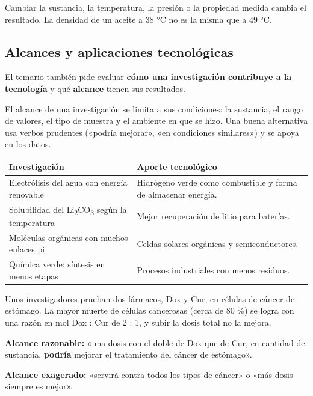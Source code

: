 \begin{ojo} Cambiar la sustancia, la temperatura, la presión o la propiedad medida cambia el resultado. La densidad de un aceite a 38 °C no es la misma que a 49 °C.\end{ojo}
\subsection{Alcances y aplicaciones tecnológicas}
El temario también pide evaluar \textbf{cómo una investigación contribuye a la tecnología} y qué \textbf{alcance} tienen sus resultados.

 

El alcance de una investigación se limita a sus condiciones: la sustancia, el rango de valores, el tipo de muestra y el ambiente en que se hizo. Una buena alternativa usa verbos prudentes («podría mejorar», «en condiciones similares») y se apoya en los datos.

 
\begin{center}\small
\begin{tabularx}{\linewidth}{@{}>{\raggedright\arraybackslash\hsize=1.00\hsize}X>{\raggedright\arraybackslash\hsize=1.00\hsize}X@{}}
\toprule
\textbf{Investigación} & \textbf{Aporte tecnológico} \\
\midrule
Electrólisis del agua con energía renovable & Hidrógeno verde como combustible y forma de almacenar energía. \\
Solubilidad del Li\textsubscript{2}CO\textsubscript{3} según la temperatura & Mejor recuperación de litio para baterías. \\
Moléculas orgánicas con muchos enlaces pi & Celdas solares orgánicas y semiconductores. \\
Química verde: síntesis en menos etapas & Procesos industriales con menos residuos. \\
\bottomrule
\end{tabularx}
\end{center}
  
\begin{ejemplo} Unos investigadores prueban dos fármacos, Dox y Cur, en células de cáncer de estómago. La mayor muerte de células cancerosas (cerca de 80 \%) se logra con una razón en mol Dox : Cur de 2 : 1, y subir la dosis total no la mejora.\par \textbf{Alcance razonable:} «una dosis con el doble de Dox que de Cur, en cantidad de sustancia, \textbf{podría} mejorar el tratamiento del cáncer de estómago».\par \textbf{Alcance exagerado:} «servirá contra todos los tipos de cáncer» o «más dosis siempre es mejor».\end{ejemplo}
 

